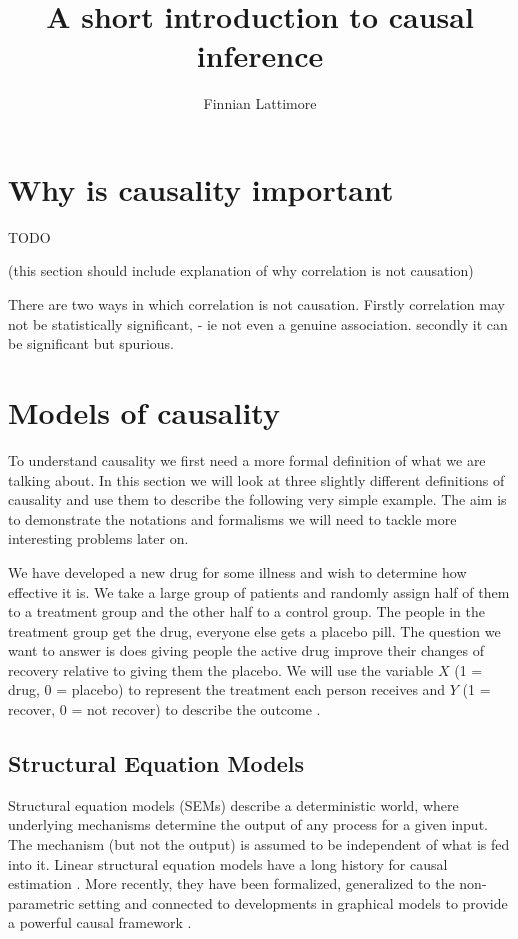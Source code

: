 \documentclass[11pt,a4paper]{article}
\author{Finnian Lattimore}
\title{A short introduction to causal inference}
\begin{document}
\def\ci{\perp\!\!\!\perp} %

\section{Why is causality important}

TODO

(this section should include explanation of why correlation is not causation)

There are two ways in which correlation is not causation. Firstly correlation may not be statistically significant, - ie not even a genuine association. secondly it can be significant but spurious. 


\section{Models of causality}
\label{sec:causalmodels}
To understand causality we first need a more formal definition of what we are talking about. In this section we will look at three slightly different definitions of causality and use them to describe the following very simple example. The aim is to demonstrate the notations and formalisms we will need to tackle more interesting problems later on.

We have developed a new drug for some illness and wish to determine how effective it is. We take a large group of patients and randomly assign half of them to a treatment group and the other half to a control group. The people in the treatment group get the drug, everyone else gets a placebo pill. The question we want to answer is does giving people the active drug improve their changes of recovery relative to giving them the placebo. We will use the variable $X$ (1 = drug, 0 = placebo) to represent the treatment each person receives and $Y$ (1 = recover, 0 = not recover) to describe the outcome .
\subsection{Structural Equation Models}

Structural equation models (SEMs) describe a deterministic world, where underlying mechanisms determine the output of any process for a given input. The mechanism (but not the output) is assumed to be independent of what is fed into it. Linear structural equation models have a long history for causal estimation \cite {Wright1921,Haavelmo1943}. More recently, they have been formalized, generalized to the non-parametric setting and connected to developments in graphical models to provide a powerful causal framework \cite{Pearl2000}.
\end{document}
